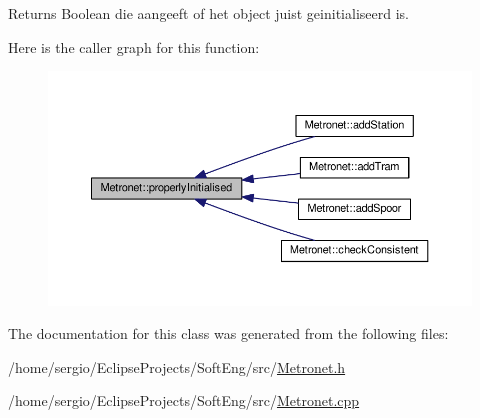 \begin{DoxyReturn}{Returns}
Boolean die aangeeft of het object juist geinitialiseerd is. 
\end{DoxyReturn}
Here is the caller graph for this function\+:\nopagebreak
\begin{figure}[H]
\begin{center}
\leavevmode
\includegraphics[width=350pt]{class_metronet_a3d2adce29a947f162924279b766de645_icgraph}
\end{center}
\end{figure}


The documentation for this class was generated from the following files\+:\begin{DoxyCompactItemize}
\item 
/home/sergio/\+Eclipse\+Projects/\+Soft\+Eng/src/\hyperlink{_metronet_8h}{Metronet.\+h}\item 
/home/sergio/\+Eclipse\+Projects/\+Soft\+Eng/src/\hyperlink{_metronet_8cpp}{Metronet.\+cpp}\end{DoxyCompactItemize}
